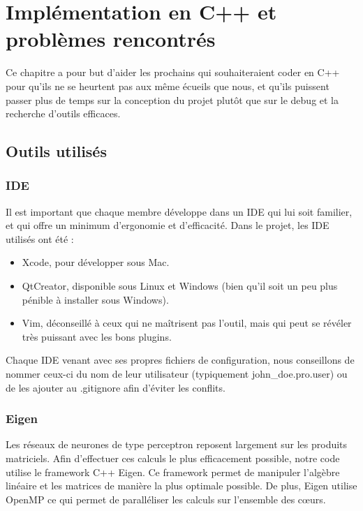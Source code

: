 \chapter{Implémentation en C++ et problèmes rencontrés}

Ce chapitre a pour but d'aider les prochains qui souhaiteraient coder en C++ pour qu'ils ne se heurtent pas aux même écueils que nous, et qu'ils puissent passer plus de temps sur la conception du projet plutôt que sur le debug et la recherche d'outils efficaces.

\section{Outils utilisés}

\subsection{IDE}

Il est important que chaque membre développe dans un IDE qui lui soit familier, et qui offre un minimum d'ergonomie et d'efficacité. Dans le projet, les IDE utilisés ont été :
\begin{itemize}
    \item Xcode, pour développer sous Mac. 
    \item QtCreator, disponible sous Linux et Windows (bien qu'il soit un peu plus pénible à installer sous Windows).
    \item Vim, déconseillé à ceux qui ne maîtrisent pas l'outil, mais qui peut se révéler très puissant avec les bons plugins.
\end{itemize}

Chaque IDE venant avec ses propres fichiers de configuration, nous conseillons de nommer ceux-ci du nom de leur utilisateur (typiquement john\_doe.pro.user) ou de les ajouter au .gitignore afin d'éviter les conflits.

\subsection{Eigen}

Les réseaux de neurones de type perceptron reposent largement sur les produits matriciels. Afin d'effectuer ces calculs le plus efficacement possible, notre code utilise le framework C++ Eigen. Ce framework permet de manipuler l'algèbre linéaire et les matrices de manière la plus optimale possible. De plus, Eigen utilise OpenMP ce qui permet de paralléliser les calculs sur l'ensemble des cœurs. 

